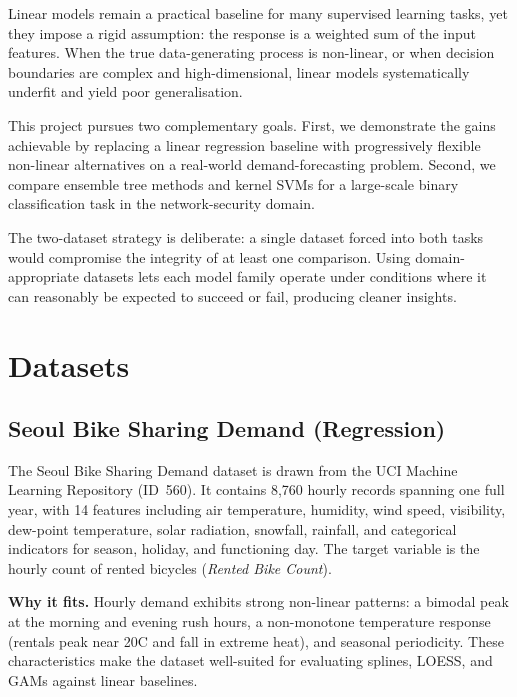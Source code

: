 \documentclass[conference]{IEEEtran}
\begin{document}
Linear models remain a practical baseline for many supervised learning tasks,
yet they impose a rigid assumption: the response is a weighted sum of the
input features. When the true data-generating process is non-linear, or when
decision boundaries are complex and high-dimensional, linear models
systematically underfit and yield poor generalisation.

This project pursues two complementary goals. First, we demonstrate the
gains achievable by replacing a linear regression baseline with progressively
flexible non-linear alternatives on a real-world demand-forecasting problem.
Second, we compare ensemble tree methods and kernel SVMs for a large-scale
binary classification task in the network-security domain.

The two-dataset strategy is deliberate: a single dataset forced into both
tasks would compromise the integrity of at least one comparison. Using
domain-appropriate datasets lets each model family operate under conditions
where it can reasonably be expected to succeed or fail, producing cleaner
insights.

\section{Datasets}\label{sec:data}

\subsection{Seoul Bike Sharing Demand (Regression)}

The Seoul Bike Sharing Demand dataset \cite{seouldataset} is drawn from the
UCI Machine Learning Repository (ID~560). It contains 8,760 hourly records
spanning one full year, with 14 features including air temperature, humidity,
wind speed, visibility, dew-point temperature, solar radiation, snowfall,
rainfall, and categorical indicators for season, holiday, and functioning day.
The target variable is the hourly count of rented bicycles
(\textit{Rented Bike Count}).

\textbf{Why it fits.} Hourly demand exhibits strong non-linear patterns:
a bimodal peak at the morning and evening rush hours, a non-monotone
temperature response (rentals peak near 20\textdegree{}C and fall in extreme
heat), and seasonal periodicity. These characteristics make the dataset
well-suited for evaluating splines, LOESS, and GAMs against linear baselines.
\end{document}
